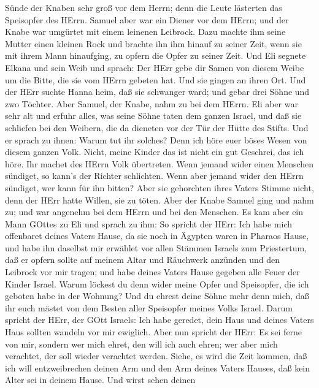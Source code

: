Sünde der Knaben sehr groß vor dem Herrn; denn die Leute lästerten das
Speisopfer des HErrn.  Samuel aber war ein Diener vor dem
HErrn; und der Knabe war umgürtet mit einem leinenen Leibrock.
 Dazu machte ihm seine Mutter einen kleinen Rock und
brachte ihn ihm hinauf zu seiner Zeit, wenn sie mit ihrem Mann
hinaufging, zu opfern die Opfer zu seiner Zeit.  Und Eli
segnete Elkana und sein Weib und sprach: Der HErr gebe dir Samen von
diesem Weibe um die Bitte, die sie vom HErrn gebeten hat. Und sie gingen
an ihren Ort.  Und der HErr suchte Hanna heim, daß sie
schwanger ward; und gebar drei Söhne und zwo Töchter. Aber Samuel, der
Knabe, nahm zu bei dem HErrn.  Eli aber war sehr alt und
erfuhr alles, was seine Söhne taten dem ganzen Israel, und daß sie
schliefen bei den Weibern, die da dieneten vor der Tür der Hütte des
Stifts.  Und er sprach zu ihnen: Warum tut ihr solches?
Denn ich höre euer böses Wesen von diesem ganzen Volk. 
Nicht, meine Kinder das ist nicht ein gut Geschrei, das ich höre. Ihr
machet des HErrn Volk übertreten.  Wenn jemand wider einen
Menschen sündiget, so kann's der Richter schlichten. Wenn aber jemand
wider den HErrn sündiget, wer kann für ihn bitten? Aber sie gehorchten
ihres Vaters Stimme nicht, denn der HErr hatte Willen, sie zu töten.
 Aber der Knabe Samuel ging und nahm zu; und war angenehm
bei dem HErrn und bei den Menschen.  Es kam aber ein Mann
GOttes zu Eli und sprach zu ihm: So spricht der HErr: Ich habe mich
offenbaret deines Vaters Hause, da sie noch in Ägypten waren in Pharaos
Hause,  und habe ihn daselbst mir erwählet vor allen
Stämmen Israels zum Priestertum, daß er opfern sollte auf meinem Altar
und Räuchwerk anzünden und den Leibrock vor mir tragen; und habe deines
Vaters Hause gegeben alle Feuer der Kinder Israel.  Warum
löckest du denn wider meine Opfer und Speisopfer, die ich geboten habe
in der Wohnung? Und du ehrest deine Söhne mehr denn mich, daß ihr euch
mästet von dem Besten aller Speisopfer meines Volks Israel.
 Darum spricht der HErr, der GOtt Israels: Ich habe
geredet, dein Haus und deines Vaters Haus sollten wandeln vor mir
ewiglich. Aber nun spricht der HErr: Es sei ferne von mir, sondern wer
mich ehret, den will ich auch ehren; wer aber mich verachtet, der soll
wieder verachtet werden.  Siehe, es wird die Zeit kommen,
daß ich will entzweibrechen deinen Arm und den Arm deines Vaters Hauses,
daß kein Alter sei in deinem Hause.  Und wirst sehen deinen
